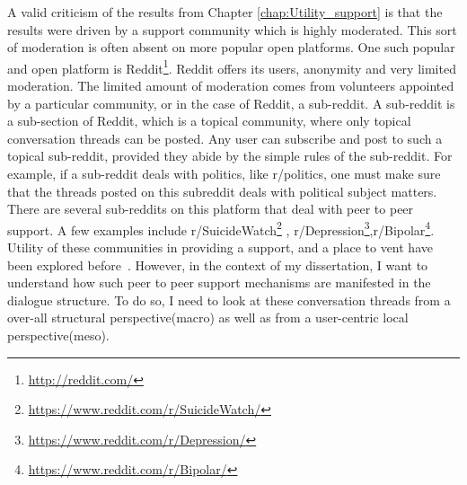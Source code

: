 A valid criticism of the results from Chapter \ref{chap:Utility_support} is that the results were driven by a support community which is highly moderated. This sort of moderation is often absent on more popular open platforms. One such popular and open platform is Reddit\footnote{\url{http://reddit.com/}}. Reddit offers its users, anonymity and very limited moderation. The limited amount of moderation comes from volunteers appointed by a particular community, or in the case of Reddit, a sub-reddit. A sub-reddit is a sub-section of Reddit, which is a topical community, where only topical conversation threads can be posted. Any user can subscribe and post to such a topical sub-reddit, provided they abide by the simple rules of the sub-reddit. For example, if a sub-reddit deals with politics, like r/politics, one must make sure that the threads posted on this subreddit deals with political subject matters. There are several sub-reddits on this platform that deal with peer to peer support. A few examples include r/SuicideWatch\footnote{\url{https://www.reddit.com/r/SuicideWatch/}} , r/Depression\footnote{\url{https://www.reddit.com/r/Depression/}},r/Bipolar\footnote{\url{https://www.reddit.com/r/Bipolar/}}. Utility of these communities in providing a support, and a place to vent have been explored before~\cite{DeChoudhury2014,DeChoudhury2016}. However, in the context of my dissertation, I want to understand how such peer to peer support mechanisms are manifested in the dialogue structure. To do so, I need to look at these conversation threads from a over-all structural perspective(macro) as well as from a user-centric local perspective(meso). 

